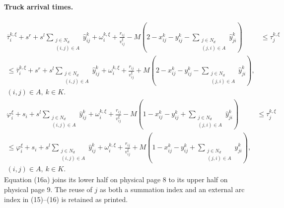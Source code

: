 \documentclass[10pt]{article}
\begin{document}
\paragraph{Truck arrival times.}
\begin{equation}
\begin{aligned}
\bar\tau_i^{k,\xi}+s^r+s^l\sum_{\substack{j\in N_d\\(i,j)\in A}}\hat y_{ij}^k+\omega_i^{k,\xi}+\frac{r_{ij}}{v_{ij}^\xi}
-M\left(2-x_{ij}^k-y_{ij}^k-\sum_{\substack{j\in N_d\\(j,i)\in A}}\hat y_{ji}^k\right)
&\leq\tau_j^{k,\xi}\\
\leq\bar\tau_i^{k,\xi}+s^r+s^l\sum_{\substack{j\in N_d\\(i,j)\in A}}\hat y_{ij}^k+\omega_i^{k,\xi}+\frac{r_{ij}}{v_{ij}^\xi}
+M\left(2-x_{ij}^k-y_{ij}^k-\sum_{\substack{j\in N_d\\(j,i)\in A}}\hat y_{ji}^k\right),&\\
(i,j)\in A,\ k\in K.&
\end{aligned}\tag{16a}
\end{equation}
\begin{equation}
\begin{aligned}
\varphi_i^\xi+s_i+s^l\sum_{\substack{j\in N_d\\(i,j)\in A}}\hat y_{ij}^k+\omega_i^{k,\xi}+\frac{r_{ij}}{v_{ij}^\xi}
-M\left(1-x_{ij}^k-y_{ij}^k+\sum_{\substack{j\in N_d\\(j,i)\in A}}\hat y_{ji}^k\right)
&\leq\tau_j^{k,\xi}\\
\leq\varphi_i^\xi+s_i+s^l\sum_{\substack{j\in N_d\\(i,j)\in A}}\hat y_{ij}^k+\omega_i^{k,\xi}+\frac{r_{ij}}{v_{ij}^\xi}
+M\left(1-x_{ij}^k-y_{ij}^k+\sum_{\substack{j\in N_d\\(j,i)\in A}}\hat y_{ji}^k\right),&\\
(i,j)\in A,\ k\in K.&
\end{aligned}\tag{16b}
\end{equation}
\noindent Equation (16a) joins its lower half on physical page 8 to its upper half on physical page 9. The reuse of $j$ as both a summation index and an external arc index in (15)--(16) is retained as printed.
\end{document}
